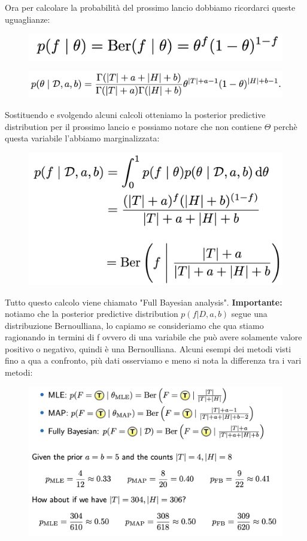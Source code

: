 \documentclass[14pt]{extreport}
\begin{document}
Ora per calcolare la probabilità del prossimo lancio dobbiamo ricordarci queste uguaglianze:

\begin{figure}[H]
\centering
\includegraphics[width=0.8\linewidth]{50.jpeg}
\end{figure}
\begin{figure}[H]
\centering
\includegraphics[width=0.8\linewidth]{51.jpeg}
\end{figure}

Sostituendo e svolgendo alcuni calcoli otteniamo la posterior predictive distribution per il prossimo lancio e possiamo notare che non contiene
$\Theta$ perchè questa variabile l'abbiamo marginalizzata:
\begin{figure}[H]
\centering
\includegraphics[width=0.6\linewidth]{52.jpeg}
\end{figure}

 Tutto questo calcolo viene chiamato "Full Bayesian analysis". \textbf{Importante: }notiamo che la posterior predictive distribution $p(f|D,a,b)$
 segue una distribuzione Bernoulliana, lo capiamo se consideriamo che qua stiamo ragionando in termini di f ovvero di una variabile che può avere
 solamente valore positivo o negativo, quindi è una Bernoulliana. Alcuni esempi dei metodi visti fino a qua a confronto, più dati osserviamo e meno si
 nota la differenza tra i vari metodi:
 
\begin{figure}[H]
\centering
\includegraphics[width=0.7\linewidth]{53.jpeg}
\end{figure}
\end{document}
